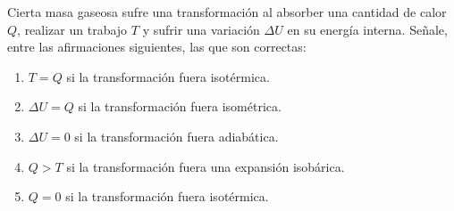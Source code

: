 Cierta masa gaseosa sufre una transformación al absorber una cantidad de calor $Q$, realizar un trabajo $T$ y sufrir una variación $\Delta U$ en su energía interna. Señale, entre las afirmaciones siguientes, las que son correctas:
\begin{enumerate}
    \item $T = Q$ si la transformación fuera isotérmica.
    \item $\Delta U = Q$ si la transformación fuera isométrica.
    \item $\Delta U = 0$ si la transformación fuera adiabática.
    \item $Q > T$ si la transformación fuera una expansión isobárica.
    \item $Q=0$ si la transformación fuera isotérmica.
\end{enumerate}